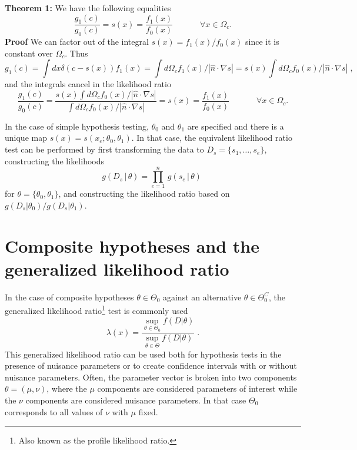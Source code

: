 \documentclass[11pt, oneside]{article}   	%
\begin{document}
\textbf{\flushleft Theorem 1:}
We have the following equalities
\begin{equation}
\frac{g_1(c)}{g_0(c)} = s(x) = \frac{f_1(x)}{f_0(x)}  \;\hspace{3em} \forall x\in\Omega_c.
\end{equation}
\textbf{Proof}
We can factor out of the integral $s(x)=f_1(x)/f_0(x)$ since it is constant over $\Omega_c$.
Thus
\begin{equation}
g_1(c) = \int dx \delta(c-s(x)) f_1(x) = \int d\Omega_c f_1(x) / | \hat{n} \cdot \nabla s  |= s(x) \int d\Omega_c f_0(x)  / | \hat{n} \cdot \nabla s  | \;,
\end{equation}
and the integrals cancel in the likelihood ratio
\begin{equation}
\frac{g_1(c)}{g_0(c)} = \frac{s(x) \int d\Omega_c f_0(x)/ | \hat{n} \cdot \nabla s  |}{ \int d\Omega_c f_0(x) / | \hat{n} \cdot \nabla s  |} = s(x) = \frac{f_1(x)}{f_0(x)}  \;\hspace{3em} \forall x\in\Omega_c.
\end{equation}

\bigskip
In the case of simple hypothesis testing, $\theta_0$ and $\theta_1$ are specified and there is a unique map $s(x) =  s(x_e; \theta_0, \theta_1)$. In that case, the equivalent likelihood ratio test can be performed by first transforming the data to $D_s = \{s_1, \dots, s_e\}$, constructing the likelihoods
\begin{equation}\label{eq:NP}
g( D_s \,|\,  \theta) = \prod_{e=1}^n \,  g( s_e \, |\,  \theta)   \; 
\end{equation}
for $\theta=\{\theta_0,\theta_1\}$, and constructing the likelihood ratio based on $g(D_s|\theta_0)/g(D_s|\theta_1)$.



\section{Composite hypotheses and the generalized likelihood ratio}\label{S:GLR}

In the case of composite hypotheses $\theta \in \Theta_0$ against an alternative $\theta \in \Theta_0^C$, the generalized likelihood ratio\footnote{Also known as the profile likelihood ratio.} test is commonly used
\begin{equation}
\lambda(x) =  \frac{ \sup_{\theta \in \Theta_0} f(D | \theta)}{ \sup_{\theta \in \Theta} f(D | \theta)} \; .
\end{equation}
This generalized likelihood ratio can be used both for hypothesis tests in the presence of nuisance parameters or to create confidence intervals with or without nuisance parameters.  Often, the parameter vector is broken into two components $\theta=(\mu,\nu)$, where the $\mu$ components are considered parameters of interest while the $\nu$ components are considered nuisance parameters. In that case $\Theta_0$ corresponds to all values of $\nu$ with $\mu$ fixed.
\end{document}
